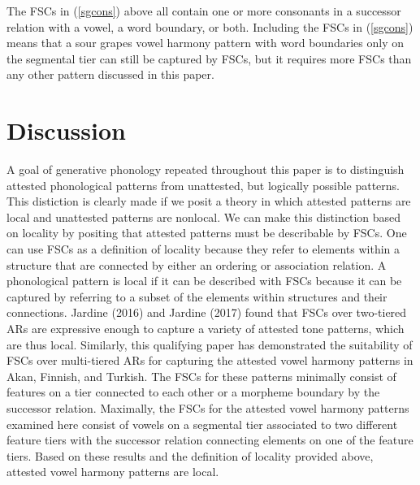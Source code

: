 \documentclass[,doc,floatsintext]{apa6}
\theoremstyle{definition}
\theoremstyle{definition}
\theoremstyle{definition}
\theoremstyle{remark}
\begin{document}
\begin{exe}
\end{exe}

\noindent The FSCs in (\ref{sgcons}) above all contain one or more
consonants in a successor relation with a vowel, a word boundary, or
both. Including the FSCs in (\ref{sgcons}) means that a sour grapes
vowel harmony pattern with word boundaries only on the segmental tier
can still be captured by FSCs, but it requires more FSCs than any other
pattern discussed in this paper.

\section{Discussion}\label{discussion}

A goal of generative phonology repeated throughout this paper is to
distinguish attested phonological patterns from unattested, but
logically possible patterns. This distiction is clearly made if we posit
a theory in which attested patterns are local and unattested patterns
are nonlocal. We can make this distinction based on locality by positing
that attested patterns must be describable by FSCs. One can use FSCs as
a definition of locality because they refer to elements within a
structure that are connected by either an ordering or association
relation. A phonological pattern is local if it can be described with
FSCs because it can be captured by referring to a subset of the elements
within structures and their connections. Jardine (2016) and Jardine
(2017) found that FSCs over two-tiered ARs are expressive enough to
capture a variety of attested tone patterns, which are thus local.
Similarly, this qualifying paper has demonstrated the suitability of
FSCs over multi-tiered ARs for capturing the attested vowel harmony
patterns in Akan, Finnish, and Turkish. The FSCs for these patterns
minimally consist of features on a tier connected to each other or a
morpheme boundary by the successor relation. Maximally, the FSCs for the
attested vowel harmony patterns examined here consist of vowels on a
segmental tier associated to two different feature tiers with the
successor relation connecting elements on one of the feature tiers.
Based on these results and the definition of locality provided above,
attested vowel harmony patterns are local.
\end{document}
